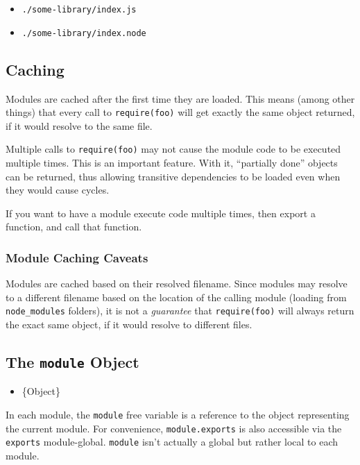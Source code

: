 \begin{itemize}
\itemsep1pt\parskip0pt
\item
  \texttt{./some-library/index.js}
\item
  \texttt{./some-library/index.node}
\end{itemize}

\subsection{Caching}\label{caching}

Modules are cached after the first time they are loaded. This means
(among other things) that every call to
\texttt{require(\textquotesingle{}foo\textquotesingle{})} will get
exactly the same object returned, if it would resolve to the same file.

Multiple calls to
\texttt{require(\textquotesingle{}foo\textquotesingle{})} may not cause
the module code to be executed multiple times. This is an important
feature. With it, ``partially done'' objects can be returned, thus
allowing transitive dependencies to be loaded even when they would cause
cycles.

If you want to have a module execute code multiple times, then export a
function, and call that function.

\subsubsection{Module Caching Caveats}\label{module-caching-caveats}

Modules are cached based on their resolved filename. Since modules may
resolve to a different filename based on the location of the calling
module (loading from \texttt{node\_modules} folders), it is not a
\emph{guarantee} that
\texttt{require(\textquotesingle{}foo\textquotesingle{})} will always
return the exact same object, if it would resolve to different files.

\subsection{\texorpdfstring{The \texttt{module}
Object}{The module Object}}\label{the-module-object}

\begin{itemize}
\itemsep1pt\parskip0pt
\item
  \{Object\}
\end{itemize}

In each module, the \texttt{module} free variable is a reference to the
object representing the current module. For convenience,
\texttt{module.exports} is also accessible via the \texttt{exports}
module-global. \texttt{module} isn't actually a global but rather local
to each module.

